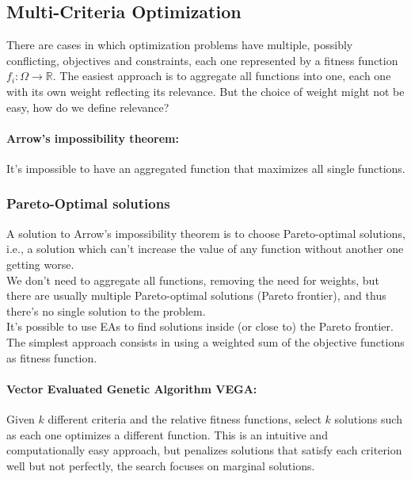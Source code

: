 \subsection{Multi-Criteria Optimization}

There are cases in which optimization problems have multiple, possibly conflicting, objectives and constraints, each one represented by a fitness function $f_i: \Omega \rightarrow \mathbb{R}$. The easiest approach is to aggregate all functions into one, each one with its own weight reflecting its relevance. But the choice of weight might not be easy, how do we define relevance? 

\paragraph{Arrow's impossibility theorem:} It's impossible to have an aggregated function that maximizes all single functions.\\

\subsubsection{Pareto-Optimal solutions}
A solution to Arrow's impossibility theorem is to choose Pareto-optimal solutions, i.e., a solution which can't increase the value of any function without another one getting worse. \\
We don't need to aggregate all functions, removing the need for weights, but there are usually multiple Pareto-optimal solutions (Pareto frontier), and thus there's no single solution to the problem. \\

It's possible to use EAs to find solutions inside (or close to) the Pareto frontier. The simplest approach consists in using a weighted sum of the objective functions as fitness function.\\

\paragraph{Vector Evaluated Genetic Algorithm VEGA:} Given $k$ different criteria and the relative fitness functions, select $k$ solutions such as each one optimizes a different function. This is an intuitive and computationally easy approach, but penalizes solutions that satisfy each criterion well but not perfectly, the search focuses on marginal solutions.\\

